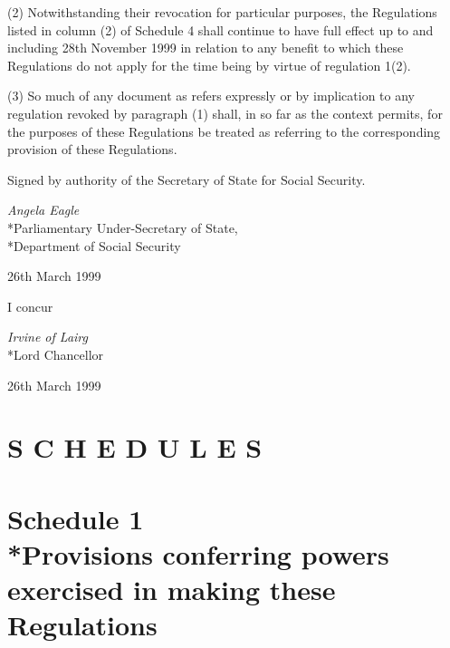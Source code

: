 \documentclass[12pt,a4paper]{article}
\begin{document}
(2) Notwithstanding their revocation for particular purposes, the Regulations listed in column (2) of Schedule 4 shall continue to have full effect up to and including 28th November 1999 in relation to any benefit to which these Regulations do not apply for the time being by virtue of regulation 1(2).

(3) So much of any document as refers expressly or by implication to any regulation revoked by paragraph (1) shall, in so far as the context permits, for the purposes of these Regulations be treated as referring to the corresponding provision of these Regulations.

\bigskip

Signed 
by authority of the Secretary of State for Social Security.

{\raggedleft
\emph{Angela Eagle}\\*Parliamentary Under-Secretary of State,\\*Department of Social Security

}

26th March 1999

\bigskip

I concur

{\raggedleft
\emph{Irvine of Lairg}\\*Lord Chancellor

}

26th March 1999

\small

\part*{S C H E D U L E S}

\part[Schedule 1 --- Provisions conferring powers exercised in making these Regulations]{Schedule 1\\*Provisions conferring powers exercised in making these Regulations}

\renewcommand\parthead{--- Schedule 1}
\end{document}
